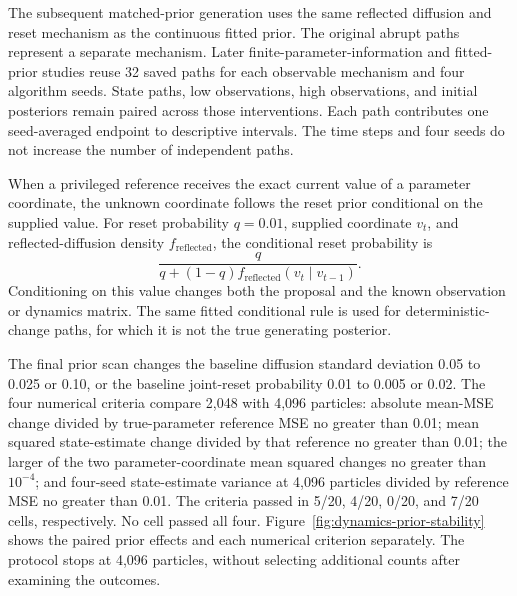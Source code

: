 \documentclass[11pt,a4paper]{article}
\begin{document}
The subsequent matched-prior generation uses the same reflected diffusion and reset mechanism as the continuous fitted prior. The original abrupt paths represent a separate mechanism. Later finite-parameter-information and fitted-prior studies reuse 32 saved paths for each observable mechanism and four algorithm seeds. State paths, low observations, high observations, and initial posteriors remain paired across those interventions. Each path contributes one seed-averaged endpoint to descriptive intervals. The time steps and four seeds do not increase the number of independent paths.

When a privileged reference receives the exact current value of a parameter coordinate, the unknown coordinate follows the reset prior conditional on the supplied value. For reset probability $q=0.01$, supplied coordinate $v_t$, and reflected-diffusion density $f_{\mathrm{reflected}}$, the conditional reset probability is
\begin{equation}
 \frac{q}{q+(1-q)f_{\mathrm{reflected}}(v_t\mid v_{t-1})}.
\end{equation}
Conditioning on this value changes both the proposal and the known observation or dynamics matrix. The same fitted conditional rule is used for deterministic-change paths, for which it is not the true generating posterior.

The final prior scan changes the baseline diffusion standard deviation 0.05 to 0.025 or 0.10, or the baseline joint-reset probability 0.01 to 0.005 or 0.02. The four numerical criteria compare 2,048 with 4,096 particles: absolute mean-MSE change divided by true-parameter reference MSE no greater than 0.01; mean squared state-estimate change divided by that reference no greater than 0.01; the larger of the two parameter-coordinate mean squared changes no greater than $10^{-4}$; and four-seed state-estimate variance at 4,096 particles divided by reference MSE no greater than 0.01. The criteria passed in 5/20, 4/20, 0/20, and 7/20 cells, respectively. No cell passed all four. Figure~\ref{fig:dynamics-prior-stability} shows the paired prior effects and each numerical criterion separately. The protocol stops at 4,096 particles, without selecting additional counts after examining the outcomes.
\end{document}
